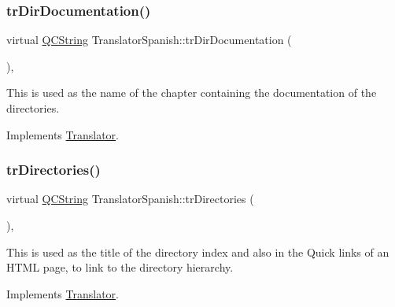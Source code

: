 \mbox{\label{class_translator_spanish_a4f9699f5844274a58e32b5651c60c903}} 
\subsubsection{\texorpdfstring{trDirDocumentation()}{trDirDocumentation()}}
{\footnotesize\ttfamily virtual \mbox{\hyperlink{class_q_c_string}{Q\+C\+String}} Translator\+Spanish\+::tr\+Dir\+Documentation (\begin{DoxyParamCaption}{ }\end{DoxyParamCaption})\hspace{0.3cm}{\ttfamily [inline]}, {\ttfamily [virtual]}}

This is used as the name of the chapter containing the documentation of the directories. 

Implements \mbox{\hyperlink{class_translator}{Translator}}.

\mbox{\label{class_translator_spanish_afe520e8844f8e72cc724a29364cf3121}} 
\subsubsection{\texorpdfstring{trDirectories()}{trDirectories()}}
{\footnotesize\ttfamily virtual \mbox{\hyperlink{class_q_c_string}{Q\+C\+String}} Translator\+Spanish\+::tr\+Directories (\begin{DoxyParamCaption}{ }\end{DoxyParamCaption})\hspace{0.3cm}{\ttfamily [inline]}, {\ttfamily [virtual]}}

This is used as the title of the directory index and also in the Quick links of an H\+T\+ML page, to link to the directory hierarchy. 

Implements \mbox{\hyperlink{class_translator}{Translator}}.

\mbox{\label{class_translator_spanish_aa5fb0a3e442c9d4104cf636ade56bea6}} 
